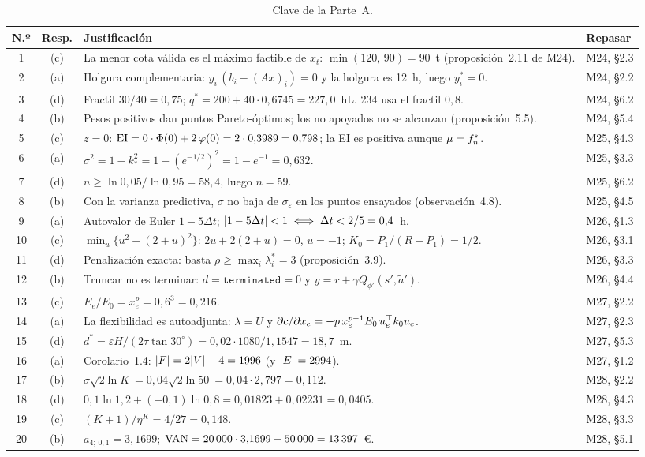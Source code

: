 \begin{table}[h]
\centering\footnotesize
\caption{Clave de la Parte~A.}\label{tab:clave}
\begin{tabularx}{\textwidth}{@{}c c >{\raggedright\arraybackslash}X l@{}}
\toprule
N.º & Resp. & Justificación & Repasar \\
\midrule
1 & (c) & La menor cota válida es el máximo factible de $x_t$: $\min(120,\,90)=90$~t (proposición~2.11 de M24). & M24, §2.3 \\
2 & (a) & Holgura complementaria: $y_i\,(b_i-(Ax)_i)=0$ y la holgura es 12~h, luego $y_i^{\ast}=0$. & M24, §2.2 \\
3 & (d) & Fractil $30/40=0{,}75$; $q^{\ast}=200+40\cdot 0{,}6745=227{,}0$~hL. 234 usa el fractil $0{,}8$. & M24, §6.2 \\
4 & (b) & Pesos positivos dan puntos Pareto-óptimos; los no apoyados no se alcanzan (proposición~5.5). & M24, §5.4 \\
5 & (c) & $z=0$: $\mathrm{EI}=0\cdot\Phi(0)+2\,\varphi(0)=2\cdot 0{,}3989=0{,}798$; la EI es positiva aunque $\mu=f^{\ast}_{n}$. & M25, §4.3 \\
6 & (a) & $\sigma^{2}=1-k_\ast^{2}=1-(e^{-1/2})^{2}=1-e^{-1}=0{,}632$. & M25, §3.3 \\
7 & (d) & $n\ge\ln 0{,}05/\ln 0{,}95=58{,}4$, luego $n=59$. & M25, §6.2 \\
8 & (b) & Con la varianza predictiva, $\sigma$ no baja de $\sigma_\varepsilon$ en los puntos ensayados (observación~4.8). & M25, §4.5 \\
9 & (a) & Autovalor de Euler $1-5\Delta t$; $\lvert1-5\Delta t\rvert<1\iff\Delta t<2/5=0{,}4$~h. & M26, §1.3 \\
10 & (c) & $\min_u\{u^{2}+(2+u)^{2}\}$: $2u+2(2+u)=0$, $u=-1$; $K_0=P_1/(R+P_1)=1/2$. & M26, §3.1 \\
11 & (d) & Penalización exacta: basta $\rho\ge\max_i\lambda_i^{\ast}=3$ (proposición~3.9). & M26, §3.3 \\
12 & (b) & Truncar no es terminar: $d=\texttt{terminated}=0$ y $y=r+\gamma Q_{\phi'}(s',\tilde a')$. & M26, §4.4 \\
13 & (c) & $E_e/E_0=x_e^{p}=0{,}6^{3}=0{,}216$. & M27, §2.2 \\
14 & (a) & La flexibilidad es autoadjunta: $\lambda=U$ y $\partial c/\partial x_e=-p\,x_e^{p-1}E_0\,u_e^{\top} k_0u_e$. & M27, §2.3 \\
15 & (d) & $d^{\ast}=\varepsilon H/(2\tau\tan 30^{\circ})=0{,}02\cdot 1080/1{,}1547=18{,}7$~m. & M27, §5.3 \\
16 & (a) & Corolario~1.4: $\lvert F\rvert=2\lvert V\rvert-4=1996$ (y $\lvert E\rvert=2994$). & M27, §1.2 \\
17 & (b) & $\sigma\sqrt{2\ln K}=0{,}04\sqrt{2\ln 50}=0{,}04\cdot 2{,}797=0{,}112$. & M28, §2.2 \\
18 & (d) & $0{,}1\ln 1{,}2+(-0{,}1)\ln 0{,}8=0{,}01823+0{,}02231=0{,}0405$. & M28, §4.3 \\
19 & (c) & $(K+1)/\eta^{K}=4/27=0{,}148$. & M28, §3.3 \\
20 & (b) & $a_{4;\,0{,}1}=3{,}1699$; $\mathrm{VAN}=20\,000\cdot 3{,}1699-50\,000=13\,397$~€. & M28, §5.1 \\
\bottomrule
\end{tabularx}
\end{table}

